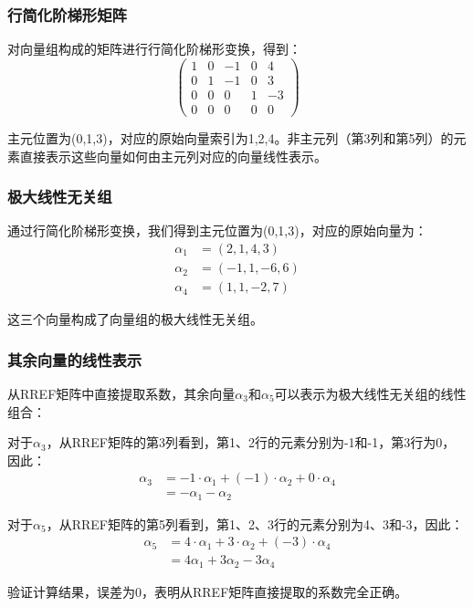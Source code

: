\documentclass[bwprint]{cumcmthesis}
\begin{document}
\subsubsection{行简化阶梯形矩阵}
对向量组构成的矩阵进行行简化阶梯形变换，得到：
\begin{equation}
\begin{pmatrix}
1 & 0 & -1 & 0 & 4 \\
0 & 1 & -1 & 0 & 3 \\
0 & 0 & 0 & 1 & -3 \\
0 & 0 & 0 & 0 & 0
\end{pmatrix}
\end{equation}

主元位置为(0,1,3)，对应的原始向量索引为1,2,4。非主元列（第3列和第5列）的元素直接表示这些向量如何由主元列对应的向量线性表示。

\subsubsection{极大线性无关组}
通过行简化阶梯形变换，我们得到主元位置为(0,1,3)，对应的原始向量为：
\begin{align}
\alpha_1 &= (2,1,4,3) \\
\alpha_2 &= (-1,1,-6,6) \\
\alpha_4 &= (1,1,-2,7)
\end{align}

这三个向量构成了向量组的极大线性无关组。

\subsubsection{其余向量的线性表示}
从RREF矩阵中直接提取系数，其余向量$\alpha_3$和$\alpha_5$可以表示为极大线性无关组的线性组合：

对于$\alpha_3$，从RREF矩阵的第3列看到，第1、2行的元素分别为-1和-1，第3行为0，因此：
\begin{align}
\alpha_3 &= -1 \cdot \alpha_1 + (-1) \cdot \alpha_2 + 0 \cdot \alpha_4\\
&= -\alpha_1 - \alpha_2
\end{align}

对于$\alpha_5$，从RREF矩阵的第5列看到，第1、2、3行的元素分别为4、3和-3，因此：
\begin{align}
\alpha_5 &= 4 \cdot \alpha_1 + 3 \cdot \alpha_2 + (-3) \cdot \alpha_4\\
&= 4\alpha_1 + 3\alpha_2 - 3\alpha_4
\end{align}

验证计算结果，误差为0，表明从RREF矩阵直接提取的系数完全正确。
\end{document}
